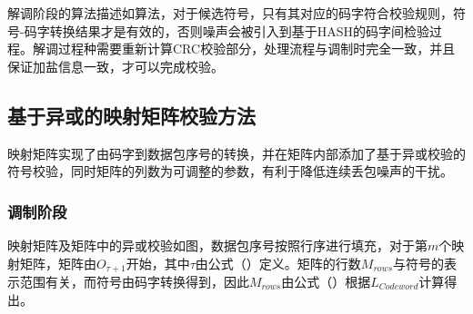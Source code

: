解调阶段的算法描述如算法，对于候选符号，只有其对应的码字符合校验规则，符号-码字转换结果才是有效的，否则噪声会被引入到基于HASH的码字间检验过程。解调过程种需要重新计算CRC校验部分，处理流程与调制时完全一致，并且保证加盐信息一致，才可以完成校验。

\subsection{基于异或的映射矩阵校验方法}
\label{chap:hash:robustness:xor}


映射矩阵实现了由码字到数据包序号的转换，并在矩阵内部添加了基于异或校验的符号校验，同时矩阵的列数为可调整的参数，有利于降低连续丢包噪声的干扰。

\subsubsection{调制阶段}
\label{chap:hash:robustness:xor:modulation}

映射矩阵及矩阵中的异或校验如图，数据包序号按照行序进行填充，对于第$m$个映射矩阵，矩阵由$O_{\tau +1}$开始，其中$\tau$由公式（）定义。矩阵的行数$M_{rows}$与符号的表示范围有关，而符号由码字转换得到，因此$M_{rows}$由公式（）根据$L_{Codeword}$计算得出。

